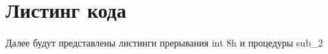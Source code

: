 \setcounter{page}{2}





\section*{Листинг кода}
 Далее будут представлены листинги прерывания int 8h и процедуры sub\_2

